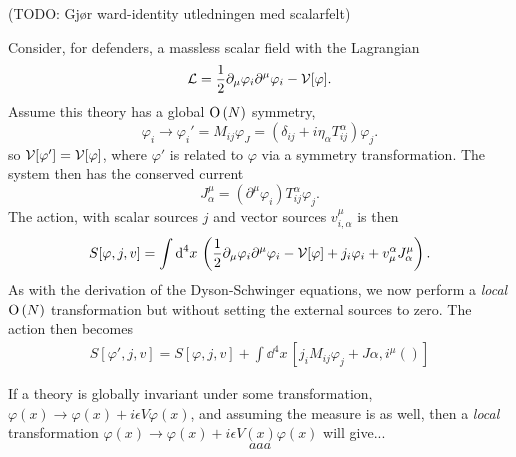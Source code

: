 \documentclass{book}
\begin{document}
(TODO: Gjør ward-identity utledningen med scalarfelt)



Consider, for defenders, a massless scalar field with the Lagrangian
%
\begin{align}
    \mathcal{L} = \frac{1}{2} \partial_\mu \varphi_i \partial^\mu \varphi_i - \mathcal{V}[\varphi]. 
\end{align}
%
Assume this theory has a global $\text{O}\left(N\right)$ symmetry,
%
\begin{equation}
    \varphi_i \rightarrow \varphi_i' = M_{ij}\varphi_J = (\delta_{ij} + i \eta_\alpha T^\alpha_{ij}) \varphi_j.
\end{equation}
%
so $\mathcal{V}[\varphi'] = \mathcal{V}[\varphi]$, where $\varphi'$ is related to $\varphi$ via a symmetry transformation.
The system then has the conserved current
%
\begin{equation}
    J^\mu_{\alpha} = (\partial^\mu \varphi_i ) T^\alpha_{ij} \varphi_j. 
\end{equation}
%
The action, with scalar sources $j$ and vector sources $v_{i,\alpha}^\mu$ is then
%
\begin{equation}
    S[\varphi, j, v]
    = 
    \int \text{d}^4 x\,
    \left(
        \frac{1}{2} \partial_\mu \varphi_i \partial^\mu \varphi_i
        - \mathcal{V}[\varphi]
        + j_i \varphi_i + v^{\alpha}_\mu J_{\alpha}^\mu
    \right).
\end{equation}
%
As with the derivation of the Dyson-Schwinger equations, we now perform a \emph{local} $\text{O}\left(N\right)$ transformation but without setting the external sources to zero.
The action then becomes
%
\begin{align}
    S[\varphi', j, v]
    = S[\varphi, j, v]
    + \int \dd^4 x \,
    \left[
        j_i M_{ij}\varphi_j
        + J{\alpha,i}^\mu
        ()
    \right]
\end{align}


If a theory is globally invariant under some transformation, $\varphi(x) \rightarrow \varphi(x) + i \epsilon V \varphi(x)$, and assuming the measure is as well, then a \emph{local} transformation $\varphi(x) \rightarrow \varphi(x) + i \epsilon V(x) \varphi(x)$ will give...
%
\begin{equation}
    aaa
\end{equation}
\end{document}
